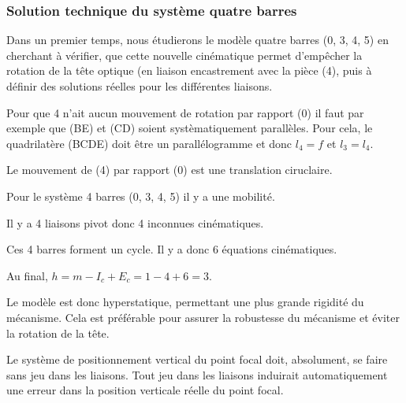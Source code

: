 \subsubsection{Solution technique du système quatre barres}
\ifprof
\else
Dans un premier temps, nous étudierons le modèle quatre barres (0, 3, 4, 5) en cherchant à vérifier, que
cette nouvelle cinématique permet d’empêcher la rotation de la tête optique (en liaison encastrement avec
la pièce (4), puis à définir des solutions réelles pour les différentes liaisons.
\fi

\ifprof
\begin{corrige}
Pour que 4 n'ait aucun mouvement de rotation par rapport (0) il faut par exemple que (BE) et (CD) soient systèmatiquement parallèles. Pour cela, le quadrilatère (BCDE) doit être un parallélogramme et donc $l_4=f$ et $l_3=l_4$.

Le mouvement de (4) par rapport (0) est une translation ciruclaire. 
\end{corrige}
\else
\fi

\ifprof
\begin{corrige}
Pour le système 4 barres  (0, 3, 4, 5) il y a une mobilité.

Il y a 4 liaisons pivot donc 4 inconnues cinématiques.

Ces 4 barres forment un cycle. Il y a donc 6 équations cinématiques. 

Au final, $h = m - I_c + E_c = 1-4+6 =3$.

Le modèle est donc hyperstatique, permettant une plus grande rigidité du mécanisme. Cela est préférable pour assurer la robustesse du mécanisme et éviter la rotation de la tête.
\end{corrige}
\else
\fi
\ifprof
\else
Le système de positionnement vertical du point focal doit, absolument, se faire sans jeu dans les liaisons.
Tout jeu dans les liaisons induirait automatiquement une erreur dans la position verticale réelle du point
focal.
\fi

